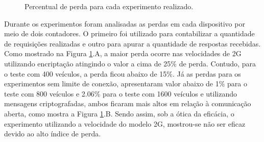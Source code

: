 \documentclass[
	12pt,				%
	oneside,			%
	a4paper,			%
	english,			%
	brazil				%
	]{abntex2ppgsi}
\begin{document}

\begin{figure}[ht!]
	\caption{Percentual de perda para cada experimento realizado.}
	\centering
	\label{fig:graficoperda}
\end{figure}  

Durante os experimentos foram analisadas as perdas em cada dispositivo por meio de dois contadores. O primeiro foi utilizado para contabilizar a quantidade de requisições realizadas  e outro para apurar a quantidade de respostas recebidas. Como mostrado na Figura \ref{fig:graficoperda}.A, a maior perda ocorre nas velocidades de 2G utilizando encriptação atingindo o valor a cima de 25\% de perda. Contudo, para o teste com 400 veículos, a perda ficou abaixo de 15\%. Já as perdas para os experimentos  sem limite de conexão, apresentaram valor abaixo de 1\% para o teste com 800 veículos e 2.06\% para o teste com 1600 veículos e utilizando mensagens criptografadas, ambos ficaram mais altos em relação à comunicação aberta, como mostra a Figura \ref{fig:graficoperda}.B.  Sendo assim, sob a ótica da eficácia, o experimento utilizando a velocidade do modelo 2G, mostrou-se não ser eficaz devido ao alto índice de perda.
\end{document}
